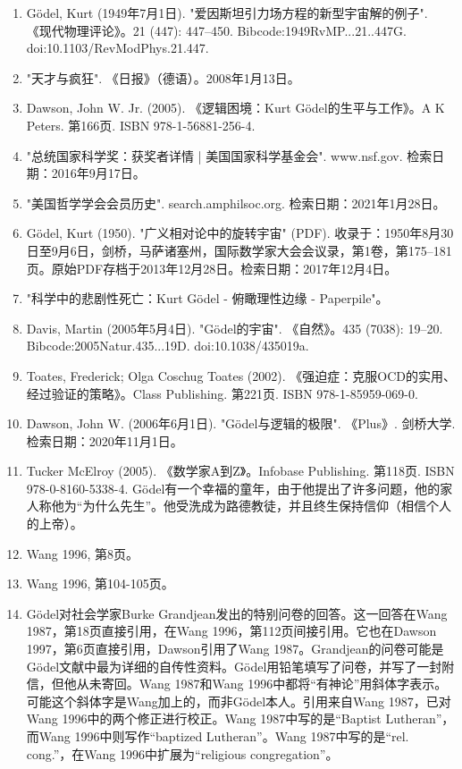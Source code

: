 \begin{enumerate}
\item Gödel, Kurt (1949年7月1日). "爱因斯坦引力场方程的新型宇宙解的例子". 《现代物理评论》。21 (447): 447–450. Bibcode:1949RvMP...21..447G. doi:10.1103/RevModPhys.21.447.  
\item "天才与疯狂". 《日报》（德语）。2008年1月13日。  
\item Dawson, John W. Jr. (2005). 《逻辑困境：Kurt Gödel的生平与工作》。A K Peters. 第166页. ISBN 978-1-56881-256-4.  
\item "总统国家科学奖：获奖者详情 | 美国国家科学基金会". www.nsf.gov. 检索日期：2016年9月17日。  
\item "美国哲学学会会员历史". search.amphilsoc.org. 检索日期：2021年1月28日。  
\item Gödel, Kurt (1950). "广义相对论中的旋转宇宙" (PDF). 收录于：1950年8月30日至9月6日，剑桥，马萨诸塞州，国际数学家大会会议录，第1卷，第175–181页。原始PDF存档于2013年12月28日。检索日期：2017年12月4日。  
\item "科学中的悲剧性死亡：Kurt Gödel - 俯瞰理性边缘 - Paperpile"。  
\item Davis, Martin (2005年5月4日). "Gödel的宇宙". 《自然》。435 (7038): 19–20. Bibcode:2005Natur.435...19D. doi:10.1038/435019a.
\item Toates, Frederick; Olga Coschug Toates (2002). 《强迫症：克服OCD的实用、经过验证的策略》。Class Publishing. 第221页. ISBN 978-1-85959-069-0.  
\item Dawson, John W. (2006年6月1日). "Gödel与逻辑的极限". 《Plus》. 剑桥大学. 检索日期：2020年11月1日。  
\item Tucker McElroy (2005). 《数学家A到Z》。Infobase Publishing. 第118页. ISBN 978-0-8160-5338-4. Gödel有一个幸福的童年，由于他提出了许多问题，他的家人称他为“为什么先生”。他受洗成为路德教徒，并且终生保持信仰（相信个人的上帝）。  
\item Wang 1996, 第8页。  
\item Wang 1996, 第104-105页。  
\item Gödel对社会学家Burke Grandjean发出的特别问卷的回答。这一回答在Wang 1987，第18页直接引用，在Wang 1996，第112页间接引用。它也在Dawson 1997，第6页直接引用，Dawson引用了Wang 1987。Grandjean的问卷可能是Gödel文献中最为详细的自传性资料。Gödel用铅笔填写了问卷，并写了一封附信，但他从未寄回。Wang 1987和Wang 1996中都将“有神论”用斜体字表示。可能这个斜体字是Wang加上的，而非Gödel本人。引用来自Wang 1987，已对Wang 1996中的两个修正进行校正。Wang 1987中写的是“Baptist Lutheran”，而Wang 1996中则写作“baptized Lutheran”。Wang 1987中写的是“rel. cong.”，在Wang 1996中扩展为“religious congregation”。
\end{enumerate}